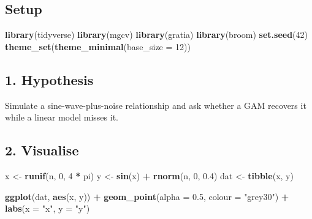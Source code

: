 \documentclass[
]{article}
\newenvironment{Shaded}{\begin{snugshade}}{\end{snugshade}}
\newcommand{\AttributeTok}[1]{\textcolor[rgb]{0.13,0.29,0.53}{#1}}
\newcommand{\DecValTok}[1]{\textcolor[rgb]{0.00,0.00,0.81}{#1}}
\newcommand{\FloatTok}[1]{\textcolor[rgb]{0.00,0.00,0.81}{#1}}
\newcommand{\FunctionTok}[1]{\textcolor[rgb]{0.13,0.29,0.53}{\textbf{#1}}}
\newcommand{\NormalTok}[1]{#1}
\newcommand{\OtherTok}[1]{\textcolor[rgb]{0.56,0.35,0.01}{#1}}
\newcommand{\SpecialCharTok}[1]{\textcolor[rgb]{0.81,0.36,0.00}{\textbf{#1}}}
\newcommand{\StringTok}[1]{\textcolor[rgb]{0.31,0.60,0.02}{#1}}
\begin{document}
\subsection{Setup}\label{setup}

\begin{Shaded}
\begin{Highlighting}[]
\FunctionTok{library}\NormalTok{(tidyverse)}
\FunctionTok{library}\NormalTok{(mgcv)}
\FunctionTok{library}\NormalTok{(gratia)}
\FunctionTok{library}\NormalTok{(broom)}
\FunctionTok{set.seed}\NormalTok{(}\DecValTok{42}\NormalTok{)}
\FunctionTok{theme\_set}\NormalTok{(}\FunctionTok{theme\_minimal}\NormalTok{(}\AttributeTok{base\_size =} \DecValTok{12}\NormalTok{))}
\end{Highlighting}
\end{Shaded}

\subsection{1. Hypothesis}\label{hypothesis}

Simulate a sine-wave-plus-noise relationship and ask whether a GAM
recovers it while a linear model misses it.

\subsection{2. Visualise}\label{visualise}

\begin{Shaded}
\begin{Highlighting}[]
\NormalTok{x }\OtherTok{\textless{}{-}} \FunctionTok{runif}\NormalTok{(n, }\DecValTok{0}\NormalTok{, }\DecValTok{4} \SpecialCharTok{*}\NormalTok{ pi)}
\NormalTok{y }\OtherTok{\textless{}{-}} \FunctionTok{sin}\NormalTok{(x) }\SpecialCharTok{+} \FunctionTok{rnorm}\NormalTok{(n, }\DecValTok{0}\NormalTok{, }\FloatTok{0.4}\NormalTok{)}
\NormalTok{dat }\OtherTok{\textless{}{-}} \FunctionTok{tibble}\NormalTok{(x, y)}

\FunctionTok{ggplot}\NormalTok{(dat, }\FunctionTok{aes}\NormalTok{(x, y)) }\SpecialCharTok{+}
  \FunctionTok{geom\_point}\NormalTok{(}\AttributeTok{alpha =} \FloatTok{0.5}\NormalTok{, }\AttributeTok{colour =} \StringTok{"grey30"}\NormalTok{) }\SpecialCharTok{+}
  \FunctionTok{labs}\NormalTok{(}\AttributeTok{x =} \StringTok{"x"}\NormalTok{, }\AttributeTok{y =} \StringTok{"y"}\NormalTok{)}
\end{Highlighting}
\end{Shaded}
\end{document}
